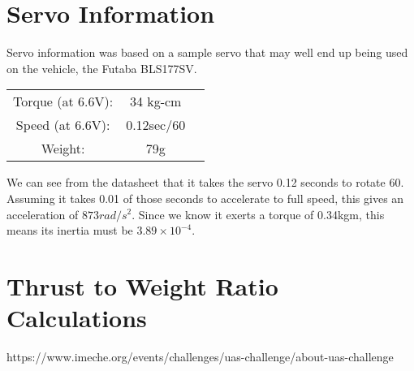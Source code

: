 \documentclass[11pt]{article}
\begin{document}
\appendix
\section{Servo Information} \label{servo_info}
Servo information was based on a sample servo that may well end up being used on the vehicle, the Futaba BLS177SV.

\begin{center}
\begin{tabular}{ccc}
    Torque (at 6.6V): & 34 kg-cm \\
    Speed (at 6.6V): & 0.12sec/60\textdegree{} \\
    Weight: & 79g \\
\end{tabular}
\end{center}

We can see from the datasheet that it takes the servo 0.12 seconds to rotate 60\textdegree{}. Assuming it takes 0.01 of those seconds to accelerate to full speed, this gives an acceleration of $873rad/s^2$. Since we know it exerts a torque of 0.34kgm, this means its inertia must be $3.89\times10^{-4}$.

\section{Thrust to Weight Ratio Calculations} \label{thrust_to_weight}



\begin{thebibliography}{11}

  https://www.imeche.org/events/challenges/uas-challenge/about-uas-challenge

\end{thebibliography}
\end{document}
